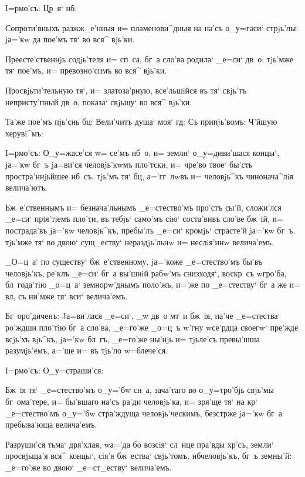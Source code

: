  I=рмо'съ: Цр~я` нб:

Сопроти'вныхъ разжж_е'нныя и= пламенови^дныя на на'съ 
о_у=гаси` стрjь'лы: jа='кw да пое'мъ тя` во вся^ вjь'ки.

Преесте'ственнjь содjь'теля и= сп~са, бг~а сло'ва 
родила` _е=си` дв~о: тjь'мже тя` пое'мъ, и= превозно'симъ 
во вся^ вjь'ки.

Просвjьти'тельную тя`, и= златоза'рную, все'льшiйся въ 
тя` свjь'тъ непристу'пный дв~о, показа` свjьщу` во вся^ 
вjь'ки.

Та'же пое'мъ пjь'снь бц: Вели'читъ душа` моя` 
гд: Съ припjь'вомъ: Ч'йшую херувi^мъ:


I=рмо'съ: О_у=жасе'ся w= се'мъ нб~о, и= земли` 
о_у=диви'шася концы`, jа='кw бг~ъ jа=ви'ся человjь'кwмъ 
пло'тски, и= чре'во твое` бы'сть простра'ннjьйшее нб~съ. 
тjь'мъ тя` бц, а='гг~лwвъ и= человjь^къ чинонача^лiя 
велича'ютъ.

Бж~е'ственнымъ и= безнача'льнымъ _е=стество'мъ про'стъ 
сы'й, сложи'лся _е=си` прiя'тiемъ пло'ти, въ тебjь` 
само'мъ сiю` соста'вивъ сло'ве бж~iй, и= пострада'въ 
jа='кw человjь^къ, пребы'лъ _е=си` кромjь` страсте'й 
jа='кw бг~ъ. тjь'мже тя` во двою` сущ_еству` 
нераздjь'льнw и= неслiя'ннw велича'емъ.

_О=ц~а` по существу` бж~е'ственному, jа='коже 
_е=стество'мъ бы'въ человjь'къ, ре'клъ _е=си` бг~а 
вы'шнiй рабw'мъ снизходя`, воскр~съ w\т гро'ба, 
бл~года'тiю _о=ц~а` земнорw'днымъ поло'жъ, и='же по 
_е=стеству` бг~а же и= вл, съ ни'мже тя` вси` 
велича'емъ.

Бг~оро'диченъ: Jа=ви'лася _е=си`, _w дв~о мт~и бж~iя, 
па'че _е=стества` ро'ждши пло'тiю бг~а сло'ва, _е=го'же 
_о=ц~ъ w'гну w\т се'рдца своегw` пре'жде всjь'хъ 
вjь^къ, jа='кw бл~гъ, _е=го'же ны'нjь и= тjьле'съ 
превы'шша разумjь'емъ, а='ще и= въ тjь'ло w=блече'ся.

 I=рмо'съ: О_у=страши'ся:

Бж~iя тя` _е=стество'мъ о_у='бw сн~а, зача'таго во 
о_у=тро'бjь свjь'мы бг~ома'тере, и= бы'вшаго на'съ ра'ди 
человjь'ка, и= зря'ще тя` на кр` _е=стество'мъ 
о_у='бw стра'ждуща человjь'ческимъ, безстр же jа='кw 
бг~а пребыва'юща велича'емъ.

Разруши'ся тьма` дря'хлая, w\т а='да бо возсiя` сл~нце 
пра'вды хр'съ, земли` просвjьща'я вся^ концы`, сiя'я 
бж~ества` свjь'томъ, нб человjь'къ, бг~ъ земны'й: 
_е=го'же во двою` _е=ст_еству` велича'емъ.

